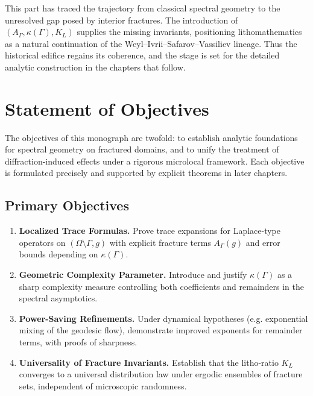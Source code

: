 This part has traced the trajectory from classical spectral geometry to the unresolved 
gap posed by interior fractures. The introduction of $(A_\Gamma, \kappa(\Gamma), K_L)$ 
supplies the missing invariants, positioning lithomathematics as a natural continuation 
of the Weyl–Ivrii–Safarov–Vassiliev lineage. Thus the historical edifice regains 
its coherence, and the stage is set for the detailed analytic construction 
in the chapters that follow.



\section{Statement of Objectives}

The objectives of this monograph are twofold: to establish analytic foundations for 
spectral geometry on fractured domains, and to unify the treatment of diffraction-induced 
effects under a rigorous microlocal framework. Each objective is formulated precisely 
and supported by explicit theorems in later chapters.

\subsection*{Primary Objectives}

\begin{enumerate}[label=\textbf{O\arabic*}]
    \item \textbf{Localized Trace Formulas.} 
    Prove trace expansions for Laplace-type operators on $(\Omega \setminus \Gamma,g)$ 
    with explicit fracture terms $A_\Gamma(g)$ and error bounds depending on 
    $\kappa(\Gamma)$.

    \item \textbf{Geometric Complexity Parameter.}
    Introduce and justify $\kappa(\Gamma)$ as a sharp complexity measure controlling 
    both coefficients and remainders in the spectral asymptotics. 

    \item \textbf{Power-Saving Refinements.}
    Under dynamical hypotheses (e.g. exponential mixing of the geodesic flow), 
    demonstrate improved exponents for remainder terms, with proofs of sharpness. 

    \item \textbf{Universality of Fracture Invariants.}
    Establish that the litho-ratio $K_L$ converges to a universal distribution law 
    under ergodic ensembles of fracture sets, independent of microscopic randomness. 
\end{enumerate}

